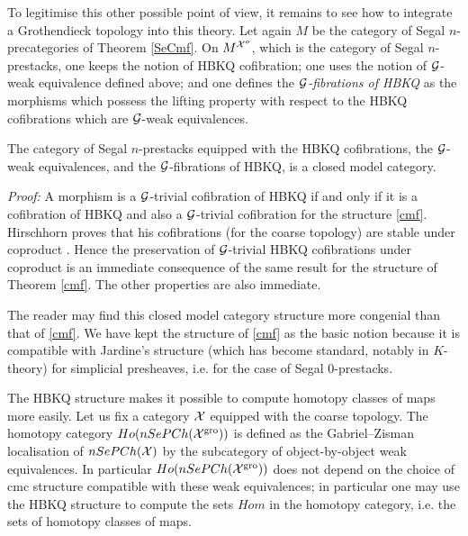 To legitimise this other possible point of view, it remains to see how to
integrate a Grothendieck topology into this theory. Let again $M$ be the
category of Segal $n$-precategories of Theorem \ref{SeCmf}. On $M^{{\cal X} ^o}$,
which is the category of Segal $n$-prestacks, one keeps the notion of HBKQ
cofibration; one uses the notion of ${\cal G}$-weak equivalence defined above; and
one defines the \emph{${\cal G}$-fibrations of HBKQ} as the morphisms which
possess the lifting property with respect to the HBKQ cofibrations which are
${\cal G}$-weak equivalences.

\begin{theorem}
\label{cmfHirschho}
The category of Segal $n$-prestacks equipped with the HBKQ cofibrations, the
${\cal G}$-weak equivalences, and the ${\cal G}$-fibrations of HBKQ, is a closed model
category.
\end{theorem}
{\em Proof:}
A morphism is a ${\cal G}$-trivial cofibration of HBKQ if and only if it is a
cofibration of HBKQ and also a ${\cal G}$-trivial cofibration for the structure
\ref{cmf}. Hirschhorn proves that his cofibrations (for the coarse topology)
are stable under coproduct \cite{Hirschhorn}. Hence the preservation of
${\cal G}$-trivial HBKQ cofibrations under coproduct is an immediate consequence
of the same result for the structure of Theorem \ref{cmf}.
The other properties are also immediate.
\eop


The reader may find this closed model category structure more congenial than
that of \ref{cmf}. We have kept the structure of \ref{cmf} as the basic
notion because it is compatible with Jardine's structure (which has become
standard, notably in $K$-theory) for simplicial presheaves, i.e. for the case
of Segal $0$-prestacks.


The HBKQ structure makes it possible to compute homotopy classes of maps more
easily. Let us fix a category ${\cal X}$ equipped with the coarse topology. The
homotopy category $Ho(nSePCh({\cal X} ^{\rm gro}))$ is defined as the
Gabriel--Zisman localisation of $nSePCh({\cal X} )$ by the subcategory of
object-by-object weak equivalences. In particular
$Ho(nSePCh({\cal X} ^{\rm gro}))$ does not depend on the choice of cmc structure
compatible with these weak equivalences; in particular one may use the HBKQ
structure to compute the sets $Hom$ in the homotopy category, i.e. the sets
of homotopy classes of maps.


